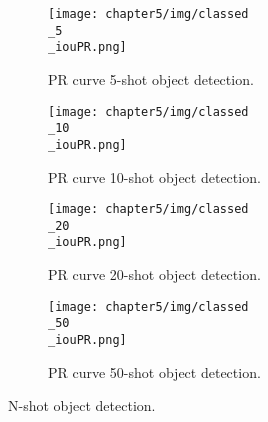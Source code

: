 \begin{figure}[H]
    \begin{adjustwidth}{-0.5in}{-0.5in}
        \centering
        \begin{subfigure}[b]{0.4\pdfpagewidth}
            \texttt{[image: chapter5/img/classed\\\_5\\\_iouPR.png]}
            \caption{PR curve 5-shot object detection.}
            \label{fig:5_n_shot_classed_5}
        \end{subfigure}
        \hfill
        \begin{subfigure}[b]{0.4\pdfpagewidth}
            \texttt{[image: chapter5/img/classed\\\_10\\\_iouPR.png]}
            \caption{PR curve 10-shot object detection.}
            \label{fig:5_n_shot_classed_10}
        \end{subfigure}
        \begin{subfigure}[b]{0.4\pdfpagewidth}
            \texttt{[image: chapter5/img/classed\\\_20\\\_iouPR.png]}
            \caption{PR curve 20-shot object detection.}
            \label{fig:5_n_shot_classed_20}
        \end{subfigure}
        \hfill
        \begin{subfigure}[b]{0.4\pdfpagewidth}
            \texttt{[image: chapter5/img/classed\\\_50\\\_iouPR.png]}
            \caption{PR curve 50-shot object detection.}
            \label{fig:5_n_shot_classed_50}
        \end{subfigure}
    \end{adjustwidth}
    \caption{N-shot object detection.}
    \label{fig:5_n_shot}
\end{figure}